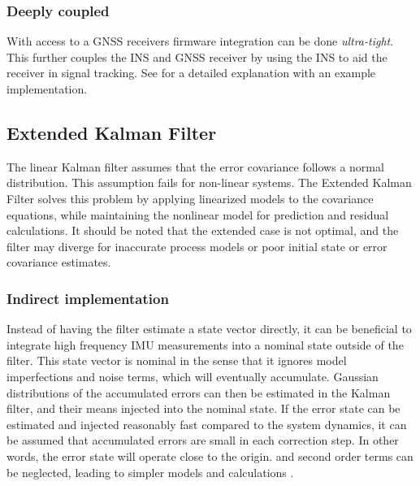     \subsubsection{Deeply coupled}
    With access to a GNSS receivers firmware integration can be done \textit{ultra-tight}. This further couples the INS and GNSS receiver by using the INS to aid the receiver in signal tracking. See \cite{kim2003ultra} for a detailed explanation with an example implementation.
    
    
\subsection{Extended Kalman Filter}
    
The linear Kalman filter assumes that the error covariance follows a normal distribution. This assumption fails for non-linear systems. The Extended Kalman Filter solves this problem by applying linearized models to the covariance equations, while maintaining the nonlinear model for prediction and residual calculations. It should be noted that the extended case is not optimal, and the filter may diverge for inaccurate process models or poor initial state or error covariance estimates.  %


    \subsubsection{Indirect implementation}
    Instead of having the filter estimate a state vector directly, it can be beneficial to integrate high frequency IMU measurements into a nominal state outside of the filter. This state vector is nominal in the sense that it ignores model imperfections and noise terms, which will eventually accumulate. Gaussian distributions of the accumulated errors can then be estimated in the Kalman filter, and their means injected into the nominal state. If the error state can be estimated and injected reasonably fast compared to the system dynamics, it can be assumed that accumulated errors are small in each correction step. In other words, the error state will operate close to the origin. and second order terms can be neglected, leading to simpler models and calculations \cite{sola2017quaternion}.\\
        
